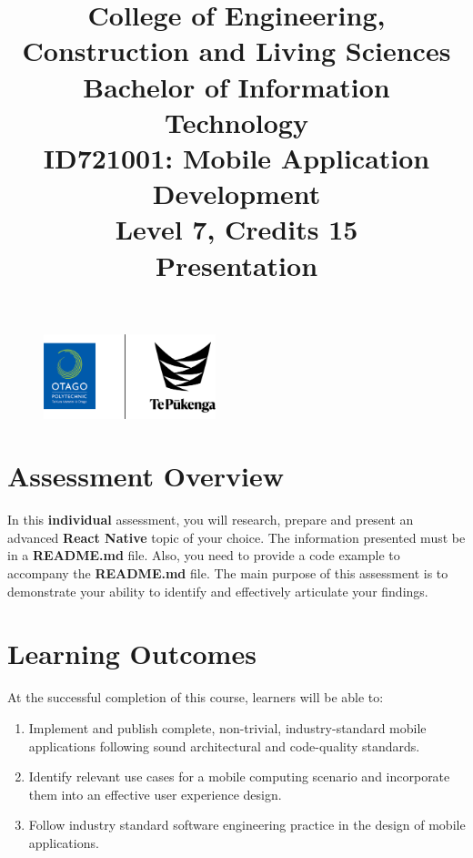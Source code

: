 \documentclass{article}
\author{}
\begin{document}
\begin{figure}
	\centering
	\includegraphics[width=50mm]{../../resources (ignore)/img/logo.png}
\end{figure} 

\title{College of Engineering, Construction and Living Sciences\\Bachelor of Information Technology\\ID721001: Mobile Application Development\\Level 7, Credits 15\\\textbf{Presentation}}
\date{}
\maketitle

\section*{Assessment Overview}
In this \textbf{individual} assessment, you will research, prepare and present an advanced \textbf{React Native} topic of your choice. The information presented must be in a \textbf{README.md} file. Also, you need to provide a code example to accompany the \textbf{README.md} file. The main purpose of this assessment is to demonstrate your ability to identify and effectively articulate your findings.

\section*{Learning Outcomes}
At the successful completion of this course, learners will be able to:
\begin{enumerate}
	\item Implement and publish complete, non-trivial, industry-standard mobile applications following sound architectural and code-quality standards.
	\item Identify relevant use cases for a mobile computing scenario and incorporate them into an effective user experience design.
	\item Follow industry standard software engineering practice in the design of mobile applications.
\end{enumerate}
\end{document}
